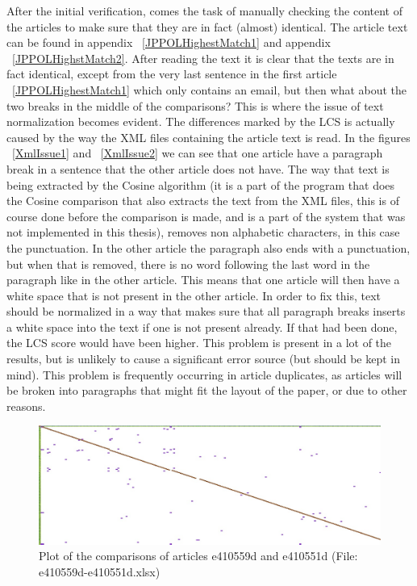 After the initial verification, comes the task of manually checking the content of the articles to make sure that they are in fact (almost) identical. The article text can be found in appendix ~\ref{JPPOLHighestMatch1} and appendix ~\ref{JPPOLHighstMatch2}. After reading the text it is clear that the texts are in fact identical, except from the very last sentence in the first article ~\ref{JPPOLHighestMatch1} which only contains an email, but then what about the two breaks in the middle of the comparisons? This is where the issue of text normalization becomes evident. The differences marked by the LCS is actually caused by the way the XML files containing the article text is read. In the figures ~\ref{XmlIssue1} and ~\ref{XmlIssue2} we can see that one article have a paragraph break in a sentence that the other article does not have. The way that text is being extracted by the Cosine algorithm (it is a part of the program that does the Cosine comparison that also extracts the text from the XML files, this is of course done before the comparison is made, and is a part of the system that was not implemented in this thesis), removes non alphabetic characters, in this case the punctuation. In the other article the paragraph also ends with a punctuation, but when that is removed, there is no word following the last word in the paragraph like in the other article. This means that one article will then have a white space that is not present in the other article. In order to fix this, text should be normalized in a way that makes sure that all paragraph breaks inserts a white space into the text if one is not present already. If that had been done, the LCS score would have been higher. This problem is present in a lot of the results, but is unlikely to cause a significant error source (but should be kept in mind). This problem is frequently occurring in article duplicates, as articles will be broken into paragraphs that might fit the layout of the paper, or due to other reasons.

\begin{figure}
	\centering
	\includegraphics[scale=0.35]{figures/e410559d}
	\caption{Plot of the comparisons of articles e410559d and e410551d (File: e410559d-e410551d.xlsx)}
	\label{JPPOLSencondHighestLCS}
\end{figure}

